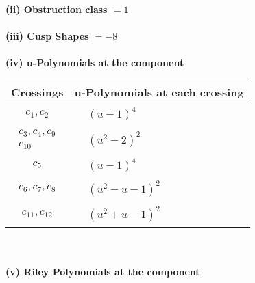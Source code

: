 \documentclass[1p]{elsarticle_modified}
\theoremstyle{definition}
\begin{document}
\flushleft \textbf{(ii) Obstruction class $= 1$}\\~\\
\flushleft \textbf{(iii) Cusp Shapes $= -8$}\\~\\
\newpage\renewcommand{\arraystretch}{1}
\flushleft \textbf{(iv) u-Polynomials at the component}\newline \\
\begin{tabular}{m{50pt}|m{274pt}}
Crossings & \hspace{64pt}u-Polynomials at each crossing \\
\hline $$\begin{aligned}c_{1},c_{2}\end{aligned}$$&$\begin{aligned}
&(u+1)^4
\end{aligned}$\\
\hline $$\begin{aligned}c_{3},c_{4},c_{9}\\c_{10}\end{aligned}$$&$\begin{aligned}
&(u^2-2)^2
\end{aligned}$\\
\hline $$\begin{aligned}c_{5}\end{aligned}$$&$\begin{aligned}
&(u-1)^4
\end{aligned}$\\
\hline $$\begin{aligned}c_{6},c_{7},c_{8}\end{aligned}$$&$\begin{aligned}
&(u^2- u-1)^2
\end{aligned}$\\
\hline $$\begin{aligned}c_{11},c_{12}\end{aligned}$$&$\begin{aligned}
&(u^2+u-1)^2
\end{aligned}$\\
\hline
\end{tabular}\\~\\
\newpage\renewcommand{\arraystretch}{1}
\flushleft \textbf{(v) Riley Polynomials at the component}\newline \\
\end{document}
